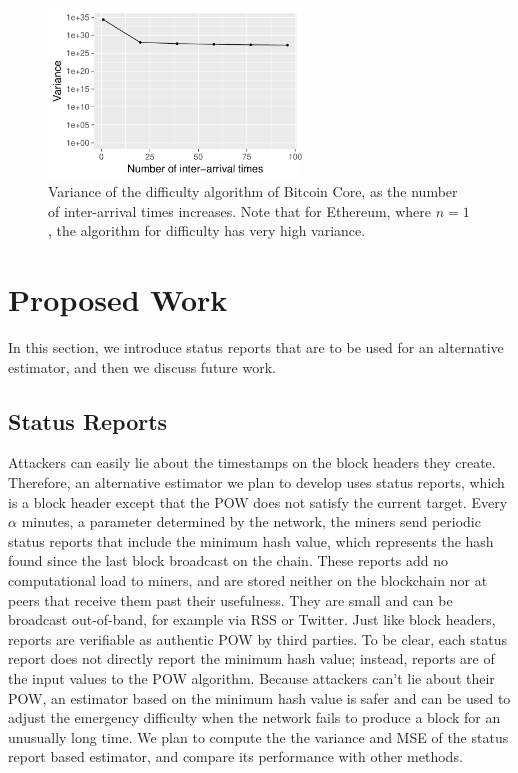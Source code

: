 \begin{figure}
\centering
    \includegraphics[width=0.6\textwidth]{graphs/var}
    \caption{Variance of the difficulty algorithm of Bitcoin Core, as the number of inter-arrival times increases. Note that for Ethereum, where $n=1$, the algorithm for difficulty has very high variance.}
    \label{fig:MSE}
\end{figure}

\section{Proposed Work} \label{section:difficulty-proposed-work}
In this section, we introduce status reports that are to be used for an alternative estimator, and then we discuss future work.

\subsection{Status Reports}
Attackers can easily lie about the timestamps on the block headers they create. Therefore, an alternative estimator we plan to develop uses status reports, which is a block header except that the POW does not satisfy the current target. Every $\alpha$ minutes, a parameter determined by the network, the miners send periodic status reports that include the minimum hash value, which represents the hash found since the last block broadcast on the chain. These reports add no computational load to miners, and are stored neither on the blockchain nor at peers that receive them past their usefulness. They are small and can be broadcast out-of-band, for example via RSS or Twitter. Just like block headers, reports are verifiable as authentic POW by third parties. To be clear, each status report does not directly report the minimum hash value; instead, reports are of the input values to the POW algorithm. Because attackers can't lie about their POW, an estimator based on the minimum hash value is safer and can be used to adjust the emergency difficulty when the network fails to produce a block for an unusually long time. We plan to compute the the variance and MSE of the status report based estimator, and compare its performance with other methods.

